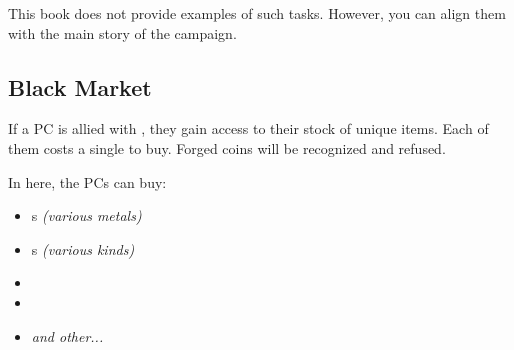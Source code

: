 This book does not provide examples of such tasks. However, you can align them with the main story of the campaign.



\subsection{Black Market}
\label{ssec:ghostbloodsHideoutMarket}

If a PC is allied with \npcFractionGhostbloods{}, they gain access to their stock of unique items. Each of them costs a single \lootScadrialCoin{} to buy. Forged coins will be recognized and refused.

In here, the PCs can buy:

\begin{itemize}
	\item \lootHemalurgicNail{}s \textit{(various metals)}
	\item \lootForgerySeal{}s \textit{(various kinds)}
	\item \lootSeonTube{}
	\item \lootWhiteSand{}
	\item \textit{and other...}
\end{itemize}




